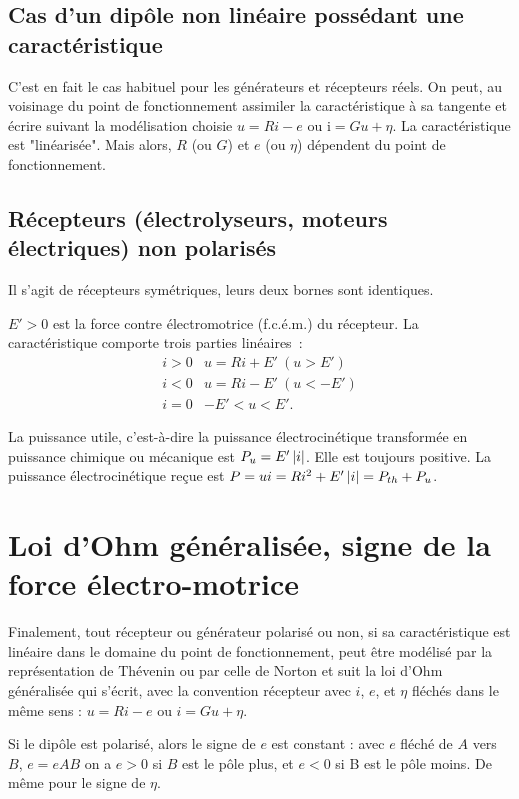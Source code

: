 \subsection{Cas d'un dipôle non linéaire possédant une caractéristique}

C'est en fait le cas habituel pour les générateurs et récepteurs réels. On peut, au voisinage du point de fonctionnement assimiler la caractéristique à sa tangente et écrire suivant la modélisation choisie $u = R i - e$ ou i$ = G u + \eta$. La caractéristique est "linéarisée". Mais alors, $R$ (ou $G$) et $e$ (ou $\eta$) dépendent du point de fonctionnement.
\subsection{Récepteurs (électrolyseurs, moteurs électriques) non polarisés}
Il s'agit de récepteurs symétriques, leurs deux bornes sont identiques. 

$E' > 0$ est la force contre électromotrice (f.c.é.m.) du récepteur. La caractéristique comporte trois parties linéaires~:
\begin{align}
i > 0 & u = R i + E' \ (u > E') \\
i < 0 & u  = R i - E' \ (u < -E') \\
i = 0 &  - E' < u < E'.
\end{align}

La puissance utile, c'est-à-dire la puissance électrocinétique transformée en puissance chimique ou mécanique est $P_u = E' \left\lvert i\right\rvert$. Elle est toujours positive. La puissance électrocinétique reçue est $P = u i = R i^2 + E' \left\lvert i\right\rvert = P_{th} + P_u$.

\section{Loi d'Ohm généralisée, signe de la force électro-motrice}
Finalement, tout récepteur ou générateur polarisé ou non, si sa caractéristique est linéaire dans le domaine du point de fonctionnement, peut être modélisé par la représentation de Thévenin ou par celle de Norton et suit la loi d'Ohm généralisée qui s'écrit, avec la convention récepteur avec $i$, $e$, et $\eta$ fléchés dans le même sens : $u = R i - e$ ou $i = G u + \eta$.

Si le dipôle est polarisé, alors le signe de $e$ est constant : avec $e$ fléché de $A$ vers $B$, $e = eAB$ on a $e > 0$ si $B$ est le pôle plus, et $e < 0$ si B est le pôle moins. De même pour le signe de $\eta$.

